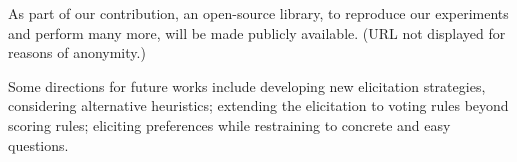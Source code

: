 \documentclass[runningheads]{llncs}
\theoremstyle{remark}
\begin{document}
As part of our contribution, an open-source library, to reproduce our experiments and perform many more, will be made publicly available. (URL not displayed for reasons of anonymity.)

Some directions for future works include developing new elicitation strategies, considering alternative heuristics; extending the elicitation to voting rules beyond scoring rules; eliciting preferences while restraining to concrete and easy questions.
%
%
%


%
\end{document}
